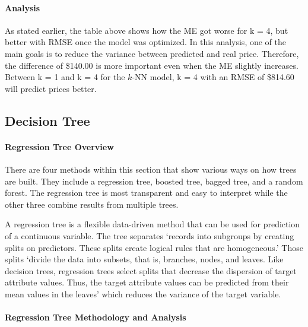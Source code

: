 \documentclass[
  paper=a4,
  ,captions=tableheading
]{scrartcl}
\begin{document}
\hypertarget{analysis}{%
\paragraph{Analysis}\label{analysis}}

As stated earlier, the table above shows how the ME got worse for k = 4,
but better with RMSE once the model was optimized. In this analysis, one
of the main goals is to reduce the variance between predicted and real
price. Therefore, the difference of \$140.00 is more important even when
the ME slightly increases. Between k = 1 and k = 4 for the \(k\)-NN
model, k = 4 with an RMSE of \$814.60 will predict prices better.

\hypertarget{decision-tree}{%
\subsection{Decision Tree}\label{decision-tree}}

\hypertarget{regression-tree-overview}{%
\paragraph{Regression Tree Overview}\label{regression-tree-overview}}

There are four methods within this section that show various ways on how
trees are built. They include a regression tree, boosted tree, bagged
tree, and a random forest. The regression tree is most transparent and
easy to interpret while the other three combine results from multiple
trees.

A regression tree is a flexible data-driven method that can be used for
prediction of a continuous variable. The tree separates `records into
subgroups by creating splits on predictors. These splits create logical
rules that are homogeneous.' Those splits `divide the data into subsets,
that is, branches, nodes, and leaves. Like decision trees, regression
trees select splits that decrease the dispersion of target attribute
values. Thus, the target attribute values can be predicted from their
mean values in the leaves' which reduces the variance of the target
variable.

\hypertarget{regression-tree-methodology-and-analysis}{%
\paragraph{Regression Tree Methodology and
Analysis}\label{regression-tree-methodology-and-analysis}}
\end{document}
